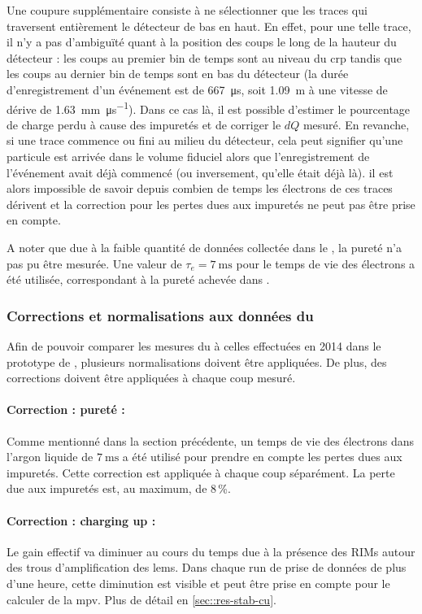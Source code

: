         Une coupure supplémentaire consiste à ne sélectionner que les traces qui traversent entièrement le détecteur de bas en haut. En effet, pour une telle trace, il n'y a pas d'ambiguïté quant à la position des coups le long de la hauteur du détecteur : les coups au premier bin de temps sont au niveau du \gls{crp} tandis que les coups au dernier bin de temps sont en bas du détecteur (la durée d'enregistrement d'un événement est de \SI{667}{\micro\second}, soit \SI{1.09}{\meter} à une vitesse de dérive de \SI{1.63}{\milli\meter\per\micro\second}). Dans ce cas là, il est possible d'estimer le pourcentage de charge perdu à cause des impuretés et de corriger le $dQ$ mesuré. En revanche, si une trace commence ou fini au milieu du détecteur, cela peut signifier qu'une particule est arrivée dans le volume fiduciel alors que l'enregistrement de l'événement avait déjà commencé (ou inversement, qu'elle était déjà là). il est alors impossible de savoir depuis combien de temps les électrons de ces traces dérivent et la correction pour les pertes dues aux impuretés ne peut pas être prise en compte.

        A noter que due à la faible quantité de données collectée dans le \TOO{}, la pureté n'a pas pu être mesurée. Une valeur de $\tau_e = \SI{7}{\milli\second}$ pour le temps de vie des électrons a été utilisée, correspondant à la pureté achevée dans \protosp{}.
        
      \subsubsection{Corrections et normalisations aux données du \threeL{}}
        
        Afin de pouvoir comparer les mesures du \TOO{} à celles effectuées en 2014 dans le prototype de \threeL{}, plusieurs normalisations doivent être appliquées. De plus, des corrections doivent être appliquées à chaque coup mesuré.

        \paragraph{Correction : pureté :} Comme mentionné dans la section précédente, un temps de vie des électrons dans l'argon liquide de $\SI{7}{\milli\second}$ a été utilisé pour prendre en compte les pertes dues aux impuretés. Cette correction est appliquée à chaque coup séparément. La perte due aux impuretés est, au maximum, de 8\,\%.

        \paragraph{Correction : charging up :} Le gain effectif va diminuer au cours du temps due à la présence des RIMs autour des trous d'amplification des \glspl{lem}. Dans chaque run de prise de données de plus d'une heure, cette diminution est visible et peut être prise en compte pour le calculer de la \gls{mpv}. Plus de détail en \autoref{sec::res-stab-cu}.

